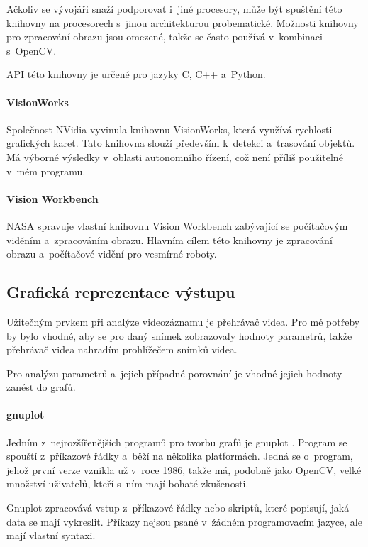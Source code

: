 Ačkoliv se vývojáři snaží podporovat i~jiné procesory, může být spuštění této knihovny na procesorech s~jinou architekturou probematické. Možnosti knihovny pro zpracování obrazu jsou omezené, takže se často používá v~kombinaci s~OpenCV.

API této knihovny je určené pro jazyky C, C++ a~Python.

\paragraph{VisionWorks}

Společnost NVidia vyvinula knihovnu VisionWorks, která využívá rychlosti grafických karet. Tato knihovna slouží především k~detekci a~trasování objektů. Má výborné výsledky v~oblasti autonomního řízení, což není příliš použitelné v~mém programu.

\paragraph{Vision Workbench}

NASA spravuje vlastní knihovnu Vision Workbench zabývající se počítačovým viděním a~zpracováním obrazu. Hlavním cílem této knihovny je zpracování obrazu a~počítačové vidění pro vesmírné roboty.



\subsection{Grafická reprezentace výstupu}

Užitečným prvkem při analýze videozáznamu je přehrávač videa. Pro mé potřeby by bylo vhodné, aby se pro daný snímek zobrazovaly hodnoty parametrů, takže přehrávač videa nahradím prohlížečem snímků videa.

Pro analýzu parametrů a~jejich případné porovnání je vhodné jejich hodnoty zanést do grafů.

\paragraph{gnuplot}

Jedním z~nejrozšířenějších programů pro tvorbu grafů je gnuplot \citep{gnuplot}. Program se spouští z~příkazové řádky a~běží na několika platformách. Jedná se o~program, jehož první verze vznikla už v~roce 1986, takže má, podobně jako OpenCV, velké množství uživatelů, kteří s~ním mají bohaté zkušenosti.

Gnuplot zpracovává vstup z~příkazové řádky nebo skriptů, které popisují, jaká data se mají vykreslit. Příkazy nejsou psané v~žádném programovacím jazyce, ale mají vlastní syntaxi.

